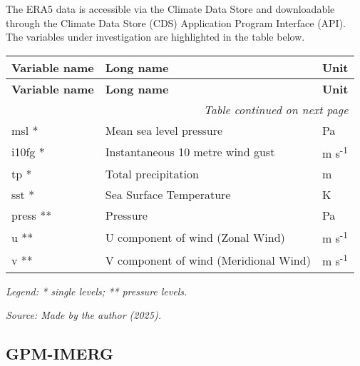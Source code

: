 The ERA5 data is accessible via the Climate Data Store and downloadable through the Climate Data Store (CDS) Application Program Interface (API). The variables under investigation are highlighted in the table below.



\begin{center}
 \label{tab:era5_variables}
\end{center}

\begin{longtable}{p{3cm} p{8cm} p{2.5cm}}
\toprule
\textbf{Variable name} & \textbf{Long name} & \textbf{Unit} \\
\midrule
\endfirsthead

\toprule
\textbf{Variable name} & \textbf{Long name} & \textbf{Unit} \\
\midrule
\endhead

\multicolumn{3}{r}{\textit{Table continued on next page}} \\
\endfoot

\bottomrule
\endlastfoot

msl *     & Mean sea level pressure                         & Pa \\
i10fg *   & Instantaneous 10 metre wind gust                & m s\textsuperscript{-1} \\
tp *      & Total precipitation                             & m \\
sst *     & Sea Surface Temperature                          & K \\
press **  & Pressure                                         & Pa \\
u **      & U component of wind (Zonal Wind)                 & m s\textsuperscript{-1} \\
v **      & V component of wind (Meridional Wind)            & m s\textsuperscript{-1} \\
\end{longtable}

\vspace{-1em}
\noindent\small\textit{Legend: * single levels; ** pressure levels.}

\vspace{1em}
\begin{center}
\textit{Source: Made by the author (2025).}
\end{center}

\subsection{GPM-IMERG}

